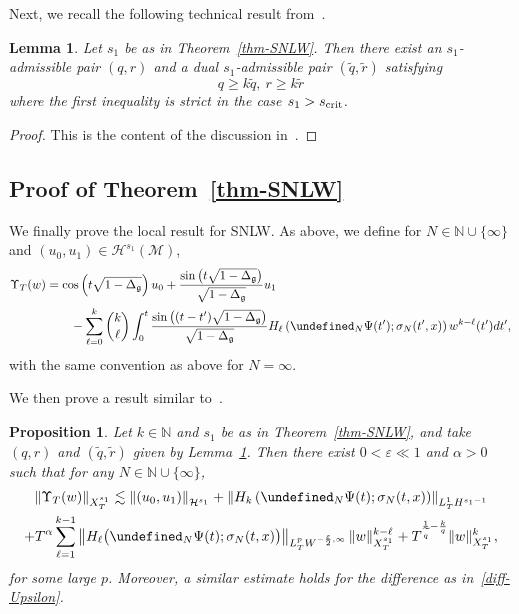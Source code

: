 \documentclass[10pt]{amsart}
\newtheorem{lemm}[theo]{Lemma}\newtheorem{prop}[theo]{Proposition}\newtheorem{coro}[theo]{Corollary}\newtheorem{conj}[theo]{Conjecture}
\theoremstyle{definition}\newtheorem{defi}[theo]{Definition}\newtheorem{rema}[theo]{Remark}\newtheorem{exam}[theo]{Example}\newtheorem{exem}[theo]{Example}\newtheorem{nota}[theo]{Notation}
\newcommand{\scrit}{s_{\textup{crit}}}
\newcommand{\N}{\mathbb{N}}
\let\P= \undefined
\newcommand{\P}{\mathbf{P}}
\newcommand{\M}{\mathcal{M}}
\renewcommand{\H}{\mathcal{H}}
\newcommand{\g}{\mathfrak{g}}
\newcommand{\al}{\alpha}
\newcommand{\Dlg}{\Delta_{\g}}
\newcommand{\eps}{\varepsilon}
\newcommand{\s}{\sigma}
\newcommand{\les}{\lesssim}
\begin{document}
Next, we recall the following technical result from~\cite{GKO}.

\begin{lemm}\label{lem-pair}
Let $s_1$ be as in Theorem~\ref{thm-SNLW}. Then there exist an $s_1$-admissible pair $(q,r)$ and a dual $s_1$-admissible pair $(\widetilde{q},\widetilde{r})$ satisfying
\begin{equation}\label{prop-pair}
q\geq k\widetilde{q},~r\geq k\widetilde{r}
\end{equation}
where the first inequality is strict in the case $s_1>\scrit$.
\end{lemm}

\begin{proof}
This is the content of the discussion in~\cite[Subsection~3.1]{GKO}.
\end{proof}

\subsection{Proof of Theorem~\ref{thm-SNLW}}
We finally prove the local result for SNLW. As above, we define for $N\in\N\cup\{\infty\}$ and $(u_0,u_1)\in\H^{s_1}(\M)$,
\begin{align*}
\Upsilon_T(w)&=\cos\left(t\sqrt{1-\Dlg}\right)u_0+\frac{\sin\left(t\sqrt{1-\Dlg}\right)}{\sqrt{1-\Dlg}}u_1\\
&\qquad -\sum_{\ell=0}^{k}{\binom k \ell}\int_0^t\frac{\sin\left((t-t')\sqrt{1-\Dlg}\right)}{\sqrt{1-\Dlg}}H_{\ell}\left(\P_N\Psi(t');\s_N(t',x)\right)w^{k-\ell}(t')dt',
\end{align*}
with the same convention as above for $N=\infty$.

We then prove a result similar to~\cite[Proposition~3.5]{GKO}.

\begin{prop}\label{prop-subcrit}
Let $k\in\N$ and $s_1$ be as in Theorem~\ref{thm-SNLW}, and take $(q,r)$ and $(\widetilde{q},\widetilde{r})$ given by Lemma~\ref{lem-pair}. Then there exist $0<\eps\ll 1$ and $\al>0$ such that for any $N\in\N\cup\{\infty\}$,
\begin{multline}\label{fixpt-SNLW}
\left\|\Upsilon_T(w)\right\|_{X^{s_1}_T} \les \left\|(u_0,u_1)\right\|_{\H^{s_1}} + \left\|H_{k}\left(\P_N\Psi(t);\s_N(t,x)\right)\right\|_{L^1_TH^{s_1-1}}\\
+ T^{\al}\sum_{\ell=1}^{k-1}\left\|H_{\ell}\big(\P_N\Psi(t);\s_N(t,x)\big)\right\|_{L^p_TW^{-\frac\eps2,\infty}}\|w\|_{X^{s_1}_T}^{k-\ell}+ T^{\frac1{\widetilde{q}}-\frac{k}{q}}\|w\|_{X^{s_1}_T}^k,
\end{multline}
for some large $p$. Moreover, a similar estimate holds for the difference as in~\eqref{diff-Upsilon}.
\end{prop}
\end{document}
